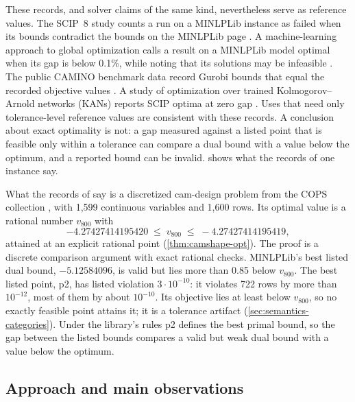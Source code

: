 These records, and solver claims of the same kind, nevertheless serve as reference values.
The SCIP~8 study counts a run on a MINLPLib instance as failed when its bounds contradict the bounds on the MINLPLib page \citep[\S3.3, author manuscript p.~23]{bestuzheva2025-global-optimization-of-mixed-integer}.
A machine-learning approach to global optimization calls a result on a MINLPLib model optimal when its gap is below 0.1\%, while noting that its solutions may be infeasible \citep[pp.~24, 32]{bertsimas2025-towards-a-practical-global-optimization}.
The public CAMINO benchmark data record Gurobi bounds that equal the recorded objective values \citep{ghezzi2026-camino-benchmark-results-for-nonconvex}.
A study of optimization over trained Kolmogorov--Arnold networks (KANs) reports SCIP optima at zero gap \citep{karia2025-deterministic-global-optimization-over-trained}.
Uses that need only tolerance-level reference values are consistent with these records.
A conclusion about exact optimality is not: a gap measured against a listed point that is feasible only within a tolerance can compare a dual bound with a value below the optimum, and a reported bound can be invalid.
 shows what the records of one instance say.

\begin{infobox}[label={box:camshape800}]{What the records of  say}
 is a discretized cam-design problem from the COPS collection \citep{dolan2004-benchmarking-optimization-software-with-cops-2}, with 1,599 continuous variables and 1,600 rows.
Its optimal value is a rational number $v_{800}$ with
\[
  -4.27427414195420 \;\le\; v_{800} \;\le\; -4.27427414195419,
\]
attained at an explicit rational point (\cref{thm:camshape-opt}).
The proof is a discrete comparison argument with exact rational checks.
MINLPLib's best listed dual bound, $-5.12584096$, is valid but lies more than 0.85 below $v_{800}$.
The best listed point, p2, has listed violation $3\cdot10^{-10}$: it violates 722 rows by more than $10^{-12}$, most of them by about $10^{-10}$.
Its objective lies at least  below $v_{800}$, so no exactly feasible point attains it; it is a tolerance artifact (\cref{sec:semantics-categories}).
Under the library's rules p2 defines the best primal bound, so the gap between the listed bounds compares a valid but weak dual bound with a value below the optimum.
\end{infobox}

\subsection{Approach and main observations}\label{sec:intro-approach}

